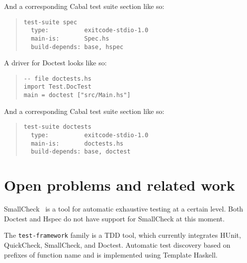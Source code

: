\documentclass[preprint]{sigplanconf}
\begin{document}
\noindent And a corresponding Cabal test suite section like so:

\begin{quote}
\small
\begin{verbatim}
test-suite spec
  type:          exitcode-stdio-1.0
  main-is:       Spec.hs
  build-depends: base, hspec
\end{verbatim}
\end{quote}

\noindent A driver for Doctest looks like so:

\begin{quote}
\small
\begin{verbatim}
-- file doctests.hs
import Test.DocTest
main = doctest ["src/Main.hs"]
\end{verbatim}
\end{quote}

\noindent And a corresponding Cabal test suite section like so:

\begin{quote}
\small
\begin{verbatim}
test-suite doctests
  type:          exitcode-stdio-1.0
  main-is:       doctests.hs
  build-depends: base, doctest
\end{verbatim}
\end{quote}

\section{Open problems and related work}

SmallCheck~\cite{smallcheck} is a tool for
automatic exhaustive testing at a certain level.
Both Doctest and Hspec do not have support for SmallCheck
at this moment.

The {\tt test-framework} family is a TDD tool, 
which currently integrates HUnit, QuickCheck, SmallCheck, and Doctest.
Automatic test discovery based on prefixes of function name
and is implemented using Template Haskell.
\end{document}
